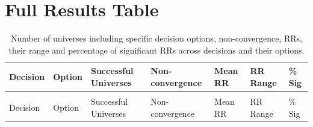 \documentclass[
  man,
  floatsintext,
  longtable,
  nolmodern,
  notxfonts,
  notimes,
  colorlinks=true,linkcolor=blue,citecolor=blue,urlcolor=blue]{apa7}
\begin{document}
\section{Full Results Table}\label{apx-full-results-table}

\begingroup\fontsize{6.5}{8.5}\selectfont

\begin{longtable}[t]{>{\raggedright\arraybackslash}p{2.5cm}>{\raggedright\arraybackslash}p{5cm}>{\raggedleft\arraybackslash}p{1.2cm}>{\raggedleft\arraybackslash}p{1.2cm}>{\raggedleft\arraybackslash}p{1.5cm}>{\centering\arraybackslash}p{2cm}>{\raggedleft\arraybackslash}p{1.2cm}}

\caption{\label{tbl-RRfulltable}Number of universes including specific
decision options, non-convergence, RRs, their range and percentage of
significant RRs across decisions and their options.}

\tabularnewline

\toprule
Decision & Option & Successful Universes & Non-convergence & Mean RR & RR Range & \% Sig\\
\midrule
\endfirsthead
\multicolumn{7}{@{}l}{\textit{(continued)}}\\
\toprule
Decision & Option & Successful Universes & Non-convergence & Mean RR & RR Range & \% Sig\\
\midrule
\endhead


\end{longtable}
\end{document}
